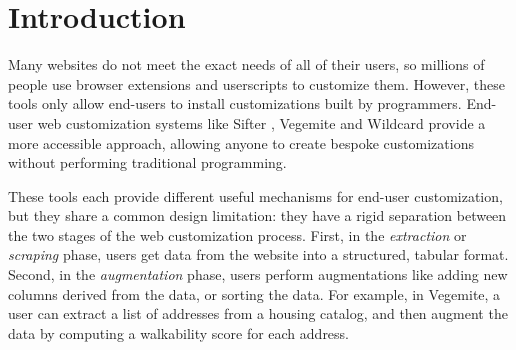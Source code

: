 \documentclass[sigconf,10pt]{acmart}
\begin{document}


\maketitle
\pagestyle{plain}

\hypertarget{sec:introduction}{%
\section{Introduction}\label{sec:introduction}}

Many websites do not meet the exact needs of all of their users, so
millions of people use browser extensions and userscripts
\citep{zotero-224, 2021f} to customize them. However, these tools only
allow end-users to install customizations built by programmers. End-user
web customization systems like Sifter \citep{huynh2006}, Vegemite
\citep{lin2009} and Wildcard \citep{litt2020} provide a more accessible
approach, allowing anyone to create bespoke customizations without
performing traditional programming.

These tools each provide different useful mechanisms for end-user
customization, but they share a common design limitation: they have a
rigid separation between the two stages of the web customization
process. First, in the \emph{extraction} or \emph{scraping} phase, users
get data from the website into a structured, tabular format. Second, in
the \emph{augmentation} phase, users perform augmentations like adding
new columns derived from the data, or sorting the data. For example, in
Vegemite, a user can extract a list of addresses from a housing catalog,
and then augment the data by computing a walkability score for each
address.
\end{document}
